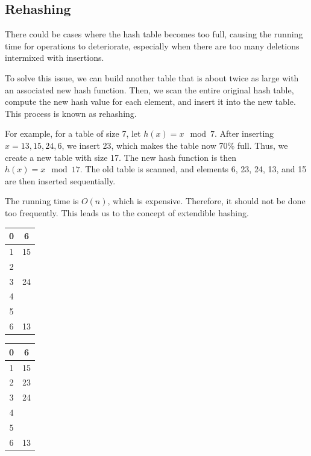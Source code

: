 \subsection{Rehashing}
\begin{minipage}{0.55\textwidth}
There could be cases where the hash table becomes too full, causing the running time for operations to deteriorate, especially when there are too many deletions intermixed with insertions.

To solve this issue, we can build another table that is about twice as large with an associated new hash function. Then, we scan the entire original hash table, compute the new hash value for each element, and insert it into the new table. This process is known as rehashing.

For example, for a table of size 7, let \(h(x) = x \mod 7\). After inserting \(x = 13, 15, 24, 6\), we insert 23, which makes the table now 70\% full. Thus, we create a new table with size 17. The new hash function is then \(h(x) = x \mod 17\). The old table is scanned, and elements 6, 23, 24, 13, and 15 are then inserted sequentially. 

The running time is \(O(n)\), which is expensive. Therefore, it should not be done too frequently. This leads us to the concept of extendible hashing.
\end{minipage}
\begin{minipage}{0.15\textwidth}
\begin{table}[H]
  \centering
  \begin{tabular}{|c|c|}
    \hline
      0 & 6 \\ \hline
      1 & 15 \\ \hline
      2 &  \\ \hline
      3 & 24 \\ \hline
      4 &  \\ \hline
      5 &  \\ \hline
      6 & 13 \\ \hline
  \end{tabular}
\end{table}
\end{minipage}
\begin{minipage}{0.15\textwidth}
\begin{table}[H]
  \centering
  \begin{tabular}{|c|c|}
    \hline
      0 & 6 \\ \hline
      1 & 15 \\ \hline
      2 & 23 \\ \hline
      3 & 24 \\ \hline
      4 &  \\ \hline
      5 &  \\ \hline
      6 & 13 \\ \hline
  \end{tabular}
\end{table}
\end{minipage}
